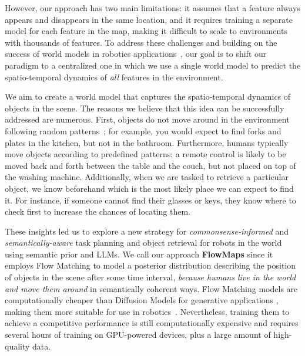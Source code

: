 \documentclass[english,
]{nserc-alliance}
\begin{document}
However, our approach has two main limitations: it assumes that a feature always appears and disappears in the same location, and it requires training a separate model for each feature in the map, making it difficult to scale to environments with thousands of features. To address these challenges and building on the success of world models in robotics applications~\cite{pi0, pmlr-v235-zhou24f}, our goal is to shift our paradigm to a centralized one in which we use a single world model to predict the spatio-temporal dynamics of \emph{all} features in the environment.

We aim to create a world model that captures the spatio-temporal dynamics of objects in the scene. The reasons we believe that this idea can be successfully addressed are numerous. First, objects do not move around in the environment following random patterns~\cite{schmid2022panoptic}; for example, you would expect to find forks and plates in the kitchen, but not in the bathroom. Furthermore, humans typically move objects according to predefined patterns: a remote control is likely to be moved back and forth between the table and the couch, but not placed on top of the washing machine. Additionally, when we are tasked to retrieve a particular object, we know beforehand which is the most likely place we can expect to find it. For instance, if someone cannot find their glasses or keys, they know where to check first to increase the chances of locating them.

These insights led us to explore a new strategy for \emph{commonsense-informed} and \emph{semantically-aware} task planning and object retrieval for robots in the world using semantic prior and LLMs. We call our approach \textbf{FlowMaps} since it employs Flow Matching \cite{lipman2022flow} to model a posterior distribution describing the position of objects in the scene after some time interval, \emph{because humans live in the world and move them around} in semantically coherent ways. Flow Matching models are computationally cheaper than Diffusion Models for generative applications \cite{lipman2022flow}, making them more suitable for use in robotics~\cite{pi0}. Nevertheless, training them to achieve a competitive performance is still computationally expensive and requires several hours of training on GPU-powered devices, plus a large amount of high-quality data.
 
 
\end{document}
